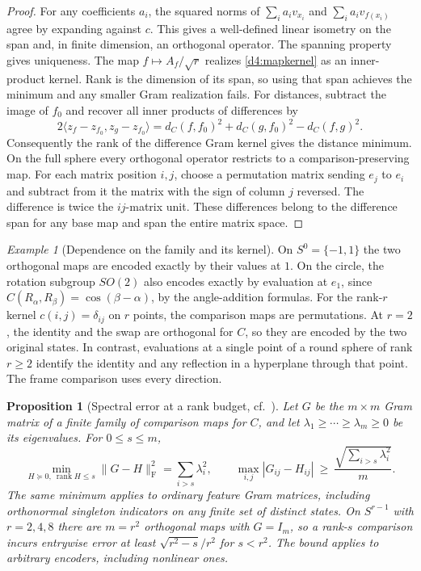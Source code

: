 \documentclass[11pt,reqno]{amsart}
\newtheorem{proposition}[theorem]{Proposition}
\theoremstyle{definition}
\theoremstyle{remark}
\newtheorem{example}[theorem]{Example}
\numberwithin{equation}{section}
\begin{document}
\begin{proof}
For any coefficients \(a_i\), the squared norms of
\(\sum_i a_i v_{x_i}\) and \(\sum_i a_i v_{f(x_i)}\) agree by expanding
against \(c\). This gives a well-defined linear isometry on the span and,
in finite dimension, an orthogonal operator. The spanning property gives
uniqueness. The map \(f\mapsto A_f/\sqrt r\) realizes \eqref{d4:mapkernel}
as an inner-product kernel. Rank is the dimension of its span, so using
that span achieves the minimum and any smaller Gram realization fails.
For distances, subtract the image of \(f_0\) and recover all inner products
of differences by
\[
 2\langle z_f-z_{f_0},z_g-z_{f_0}\rangle
 =d_C(f,f_0)^2+d_C(g,f_0)^2-d_C(f,g)^2 .
\]
Consequently the rank of the difference Gram kernel gives the distance
minimum. On the full sphere every orthogonal operator restricts to a
comparison-preserving map. For each matrix position \(i,j\), choose a
permutation matrix sending \(e_j\) to \(e_i\) and subtract from it the
matrix with the sign of column \(j\) reversed. The difference is twice the
\(ij\)-matrix unit. These differences belong to the difference span for
any base map and span the entire matrix space.
\end{proof}

\begin{example}[Dependence on the family and its kernel]\label{d4:small}
On \(S^0=\{-1,1\}\) the two orthogonal maps are encoded exactly by their
values at \(1\). On the circle, the rotation subgroup \(SO(2)\) also
encodes exactly by evaluation at \(e_1\), since
\(C(R_\alpha,R_\beta)=\cos(\beta-\alpha)\), by the angle-addition formulas.
For the rank-\(r\) kernel \(c(i,j)=\delta_{ij}\) on \(r\) points, the
comparison maps are permutations. At \(r=2\), the identity and the swap
are orthogonal for \(C\), so they are encoded by the two original states.
In contrast, evaluations at a single point of a round sphere of rank
\(r\ge2\) identify the identity and any reflection in a hyperplane through
that point. The frame comparison uses every direction.
\end{example}

\begin{proposition}[Spectral error at a rank budget, cf.\ \cite{d4-ey}]\label{d4:spectral}
Let \(G\) be the \(m\times m\) Gram matrix of a finite family of comparison
maps for \(C\), and let \(\lambda_1\ge\cdots\ge\lambda_m\ge0\) be its
eigenvalues. For \(0\le s\le m\),
\begin{equation}\label{d4:gram-tail}
 \min_{H\succeq0,\ \operatorname{rank}H\le s}\|G-H\|_{\mathrm F}^2
 =\sum_{i>s}\lambda_i^2,\qquad
 \max_{i,j}|G_{ij}-H_{ij}|\ \ge\ \frac{\sqrt{\sum_{i>s}\lambda_i^2}}{m}.
\end{equation}
The same minimum applies to ordinary feature Gram matrices, including
orthonormal singleton indicators on any finite set of distinct states.
On \(S^{r-1}\) with \(r=2,4,8\) there are \(m=r^2\) orthogonal maps with
\(G=I_m\), so a rank-\(s\) comparison incurs entrywise error at least
\(\sqrt{r^2-s}/r^2\) for \(s<r^2\). The bound applies to arbitrary
encoders, including nonlinear ones.
\end{proposition}
\end{document}
